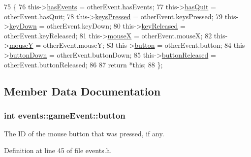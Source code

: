 \begin{DoxyCode}
75                                                          \{
76             this->\hyperlink{structevents_1_1game_event_a96b2729eb6d01e42431da7ac1a4d28a2}{hasEvents} = otherEvent.hasEvents;
77             this->\hyperlink{structevents_1_1game_event_a201a773c16c73b1c8e5101274cc4de97}{hasQuit} = otherEvent.hasQuit;
78             this->\hyperlink{structevents_1_1game_event_ac32c30a19cd0332094317a2f42e25b4b}{keysPressed} = otherEvent.keysPressed;
79             this->\hyperlink{structevents_1_1game_event_a81ecfd12bec9ce82b20462df4442c6c0}{keyDown} = otherEvent.keyDown;
80             this->\hyperlink{structevents_1_1game_event_adaac56b596a9462763fc6504c0059fb9}{keyReleased} = otherEvent.keyReleased;
81             this->\hyperlink{structevents_1_1game_event_a0d128e01aa0f7a2d1dec15b3753872e2}{mouseX} = otherEvent.mouseX;
82             this->\hyperlink{structevents_1_1game_event_adbeaaa754e8cd4d5895ac37162d0bd6d}{mouseY} = otherEvent.mouseY;
83             this->\hyperlink{structevents_1_1game_event_a95165a2ecae8e54ecf685c65ec9882f2}{button} = otherEvent.button;
84             this->\hyperlink{structevents_1_1game_event_ab89824ec88726cc79e11869d38d56aed}{buttonDown} = otherEvent.buttonDown;
85             this->\hyperlink{structevents_1_1game_event_ab0db744a869247106087de674e7dbfca}{buttonReleased} = otherEvent.buttonReleased;
86 
87             \textcolor{keywordflow}{return} *\textcolor{keyword}{this};
88         \};
\end{DoxyCode}


\subsection{Member Data Documentation}
\hypertarget{structevents_1_1game_event_a95165a2ecae8e54ecf685c65ec9882f2}{}
\subsubsection[{button}]{\setlength{\rightskip}{0pt plus 5cm}int events\+::game\+Event\+::button}\label{structevents_1_1game_event_a95165a2ecae8e54ecf685c65ec9882f2}


The I\+D of the mouse button that was pressed, if any. 



Definition at line 45 of file events.\+h.



